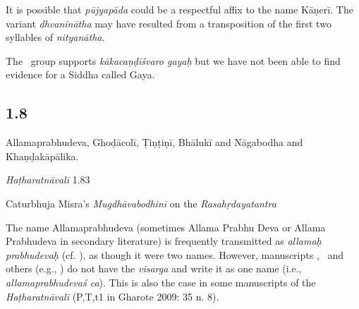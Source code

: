 \begin{ekdosis}
\begin{testimonia}[hp01_007]
\begin{versinnote}
\end{versinnote}

\end{testimonia}

\begin{philcomm}[hp01_007]   
It is possible that \emph{pūjyapāda} could be a respectful affix to the name Kāṇerī. The variant \emph{dhvaninātha} may have resulted from a transposition of the first two syllables of \emph{nityanātha}.    

The \textalpha\ group supports \emph{kākacaṇḍīśvaro gayaḥ} but we have not been able to find evidence for a Siddha called Gaya.
\end{philcomm}

\subsection*{1.8}
\begin{translation}[hp01_008]
Allamaprabhudeva, Ghoḍācolī, Ṭiṇṭiṇī, Bhālukī and Nāgabodha and Khaṇḍakāpālika.
\end{translation}

\begin{testimonia}[hp01_008]
\emph{Haṭharatnāvalī} 1.83

\begin{versinnote}
\tl{\var{allamaḥ prabhudevaś ] allamaprabhudevaś P,T,t1}\\!}
\end{versinnote}

Caturbhuja Misra's \emph{Mugdhāvabodhinī} on the \emph{Rasahṛdayatantra}

\begin{versinnote}
\end{versinnote}

\end{testimonia}

\begin{philcomm}[hp01_008]  
The name Allamaprabhudeva (sometimes Allama Prabhu Deva or Allama Prabhudeva in secondary literature) is frequently transmitted as \emph{allamaḥ prabhu\-devaḥ} (cf. \alphaTwo), as though it were two names. However, manuscripts \alphaOne, \alphaThree\ and others (e.g., ) do not have the \emph{visarga} and write it as one name (i.e., \emph{allamaprabhudevaś ca}). This is also the case in some manuscripts of the \emph{Haṭharatnāvalī} (P,T,t1 in Gharote 2009: 35 n. 8). 


\end{philcomm}
\end{ekdosis}
